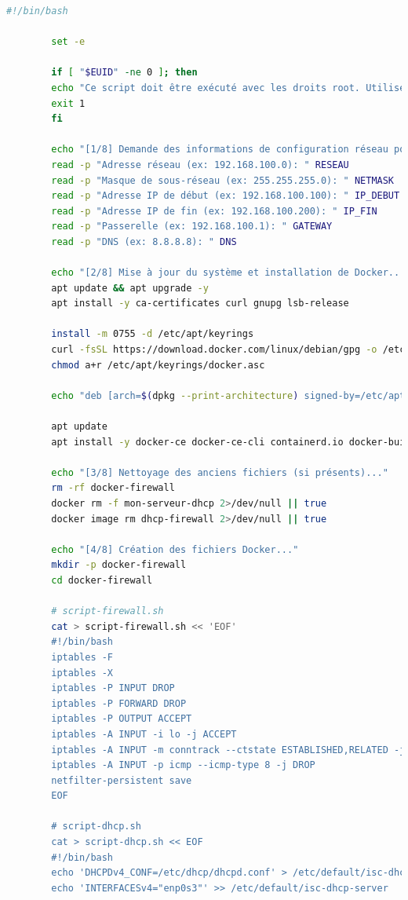 	\begin{lstlisting}[language=bash]
		#!/bin/bash
		
		set -e
		
		if [ "$EUID" -ne 0 ]; then
		echo "Ce script doit être exécuté avec les droits root. Utilisez 'sudo ./setup-dhcp-firewall.sh'"
		exit 1
		fi
		
		echo "[1/8] Demande des informations de configuration réseau pour le DHCP..."
		read -p "Adresse réseau (ex: 192.168.100.0): " RESEAU
		read -p "Masque de sous-réseau (ex: 255.255.255.0): " NETMASK
		read -p "Adresse IP de début (ex: 192.168.100.100): " IP_DEBUT
		read -p "Adresse IP de fin (ex: 192.168.100.200): " IP_FIN
		read -p "Passerelle (ex: 192.168.100.1): " GATEWAY
		read -p "DNS (ex: 8.8.8.8): " DNS
		
		echo "[2/8] Mise à jour du système et installation de Docker..."
		apt update && apt upgrade -y
		apt install -y ca-certificates curl gnupg lsb-release
		
		install -m 0755 -d /etc/apt/keyrings
		curl -fsSL https://download.docker.com/linux/debian/gpg -o /etc/apt/keyrings/docker.asc
		chmod a+r /etc/apt/keyrings/docker.asc
		
		echo "deb [arch=$(dpkg --print-architecture) signed-by=/etc/apt/keyrings/docker.asc] https://download.docker.com/linux/debian $(. /etc/os-release && echo \"$VERSION_CODENAME\") stable" | tee /etc/apt/sources.list.d/docker.list > /dev/null
		
		apt update
		apt install -y docker-ce docker-ce-cli containerd.io docker-buildx-plugin docker-compose-plugin
		
		echo "[3/8] Nettoyage des anciens fichiers (si présents)..."
		rm -rf docker-firewall
		docker rm -f mon-serveur-dhcp 2>/dev/null || true
		docker image rm dhcp-firewall 2>/dev/null || true
		
		echo "[4/8] Création des fichiers Docker..."
		mkdir -p docker-firewall
		cd docker-firewall
		
		# script-firewall.sh
		cat > script-firewall.sh << 'EOF'
		#!/bin/bash
		iptables -F
		iptables -X
		iptables -P INPUT DROP
		iptables -P FORWARD DROP
		iptables -P OUTPUT ACCEPT
		iptables -A INPUT -i lo -j ACCEPT
		iptables -A INPUT -m conntrack --ctstate ESTABLISHED,RELATED -j ACCEPT
		iptables -A INPUT -p icmp --icmp-type 8 -j DROP
		netfilter-persistent save
		EOF
		
		# script-dhcp.sh
		cat > script-dhcp.sh << EOF
		#!/bin/bash
		echo 'DHCPDv4_CONF=/etc/dhcp/dhcpd.conf' > /etc/default/isc-dhcp-server
		echo 'INTERFACESv4="enp0s3"' >> /etc/default/isc-dhcp-server
		

\end{lstlisting}
